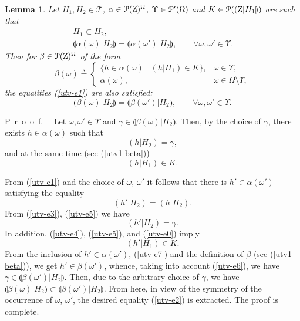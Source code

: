 \documentclass[sn-mathphys,Numbered,pdflatex]{sn-jnl}%
\theoremstyle{thmstyleone}%
\theoremstyle{thmstyletwo}%
\theoremstyle{thmstylethree}%
\newtheorem{lem}{Lemma}
\renewcommand{\proof}{\par\mbox{P r o o f.}\ \ }
\newcommand{\beq}{\begin{equation}}
\newcommand{\eeq}{\end{equation}}
\newcommand{\mydef}{\mathrel{\triangleq}}%
\newcommand{\icP}[1]{\EuScript{P}({#1})}%
\newcommand{\icPp}[1]{\EuScript{P^\prime}({#1})}%
\newcommand{\res}[2]{\ensuremath{(#1|#2)}}%
\newcommand{\naOm}{\ensuremath{\Omega}}%
\newcommand{\naZ}{\ensuremath{\mathrm{Z}}}%
\newcommand{\naTc}{\ensuremath{\mathcal{T}}}%
\newcommand{\sres}[2]{\llparenthesis#1|#2\rrparenthesis}%
\newcommand{\fref}[1]{{\rm(\ref{#1})}}   %
\begin{document}
\begin{lem}\label{utv1}
Let $H_1,H_2\in\naTc$, $\alpha\in\icP{\naZ}^\naOm$, $\Upsilon\in\icPp{\naOm}$ and $K\in\icP{\sres{ \naZ}{H_1}}$ are such that
\begin{gather}
H_1\subset H_2,\label{utv-e0}\\
\sres{\alpha(\omega)}{H_2}=\sres{\alpha(\omega')}{H_2},\qquad\forall\omega,\omega'\in\Upsilon.\label{utv-e1}
\end{gather}
Then for $\beta\in\icP{\naZ}^\naOm$ of the form
\beq\label{utv1-beta}
\beta(\omega)\mydef
\begin{cases}
\{h\in\alpha(\omega)\mid\res{h}{H_1}\in K\}, &\omega\in\Upsilon,\\
\alpha(\omega), &\omega\in\naOm\setminus\Upsilon,
\end{cases}
\eeq
the equalities \fref{utv-e1} are also satisfied:
\beq\label{utv-e2}
\sres{\beta(\omega)}{H_2}=\sres{\beta(\omega')}{H_2},\qquad\forall\omega,\omega'\in\Upsilon.
\eeq
\end{lem}

\proof
Let $\omega,\omega'\in\Upsilon$ and $\gamma\in\sres{\beta(\omega)}{H_2}$.
Then, by the choice of $\gamma$, there exists $h\in\alpha(\omega)$ such that
\begin{equation}\label{utv-e3}
\res{h}{H_2}=\gamma,
\end{equation}
and at the same time (see \fref{utv1-beta})
\begin{equation}\label{utv-e4}
\res{h}{H_1}\in K.
\end{equation}

From \fref{utv-e1} and the choice of $\omega$, $\omega'$ it follows that there is $h'\in\alpha(\omega')$ satisfying the equality
\begin{equation}\label{utv-e5}
\res{h'}{H_2}=\res{h}{H_2}.
\end{equation}
From \fref{utv-e3}, \fref{utv-e5} we have
\begin{equation}\label{utv-e6}
\res{h'}{H_2}=\gamma.
\end{equation}
In addition, \fref{utv-e4}, \fref{utv-e5}, and \fref{utv-e0} imply
\begin{equation}\label{utv-e7}
\res{h'}{H_1}\in K.
\end{equation}
From the inclusion of $h'\in\alpha(\omega')$, \fref{utv-e7} and the definition of $\beta$ (see \fref{utv1-beta}), we get $h'\in\beta(\omega')$, whence, taking into account \fref{utv-e6}, we have $\gamma\in\sres{\beta(\omega')}{H_2}$.
Then, due to the arbitrary choice of $\gamma$, we have $\sres{\beta(\omega)}{H_2}\subset\sres{\beta(\omega')}{H_2}$.
From here, in view of the symmetry of the occurrence of $\omega$, $\omega'$, the desired equality \fref{utv-e2} is extracted.
The proof is complete.
\end{document}
